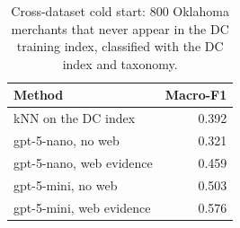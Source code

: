 \begin{table}[t]
\centering
\caption{Cross-dataset cold start: 800 Oklahoma merchants that never appear in the DC training index, classified with the DC index and taxonomy.}
\label{tab:coldstart}
\begin{tabular}{lr}
\toprule
Method & Macro-F1\\
\midrule
kNN on the DC index & 0.392 \\
gpt-5-nano, no web & 0.321 \\
gpt-5-nano, web evidence & 0.459 \\
gpt-5-mini, no web & 0.503 \\
gpt-5-mini, web evidence & 0.576 \\
\bottomrule
\end{tabular}
\end{table}
